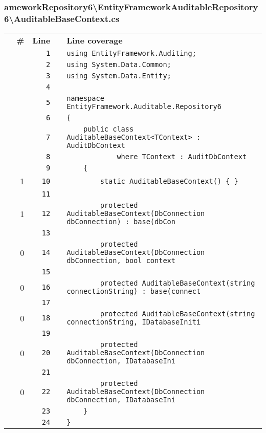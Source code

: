 \documentclass[a4paper,10pt]{article}
\begin{document}
\subsubsection{ameworkRepository6\textbackslash EntityFrameworkAuditableRepository6\textbackslash AuditableBaseContext.cs}
\begin{longtable}[l]{lrrll}
\textbf{} & \textbf{\#} & \textbf{Line} & \textbf{} & \textbf{Line coverage}\\
\cellcolor{gray} &  & \verb~1~ & & \verb~using EntityFramework.Auditing;~\\
\cellcolor{gray} &  & \verb~2~ & & \verb~using System.Data.Common;~\\
\cellcolor{gray} &  & \verb~3~ & & \verb~using System.Data.Entity;~\\
\cellcolor{gray} &  & \verb~4~ & & \verb~~\\
\cellcolor{gray} &  & \verb~5~ & & \verb~namespace EntityFramework.Auditable.Repository6~\\
\cellcolor{gray} &  & \verb~6~ & & \verb~{~\\
\cellcolor{gray} &  & \verb~7~ & & \verb~    public class AuditableBaseContext<TContext> : AuditDbContext~\\
\cellcolor{gray} &  & \verb~8~ & & \verb~            where TContext : AuditDbContext~\\
\cellcolor{gray} &  & \verb~9~ & & \verb~    {~\\
\cellcolor{green} & 1 & \verb~10~ & & \verb~        static AuditableBaseContext() { }~\\
\cellcolor{gray} &  & \verb~11~ & & \verb~~\\
\cellcolor{green} & 1 & \verb~12~ & & \verb~        protected AuditableBaseContext(DbConnection dbConnection) : base(dbCon~\\
\cellcolor{gray} &  & \verb~13~ & & \verb~~\\
\cellcolor{red} & 0 & \verb~14~ & & \verb~        protected AuditableBaseContext(DbConnection dbConnection, bool context~\\
\cellcolor{gray} &  & \verb~15~ & & \verb~~\\
\cellcolor{red} & 0 & \verb~16~ & & \verb~        protected AuditableBaseContext(string connectionString) : base(connect~\\
\cellcolor{gray} &  & \verb~17~ & & \verb~~\\
\cellcolor{red} & 0 & \verb~18~ & & \verb~        protected AuditableBaseContext(string connectionString, IDatabaseIniti~\\
\cellcolor{gray} &  & \verb~19~ & & \verb~~\\
\cellcolor{red} & 0 & \verb~20~ & & \verb~        protected AuditableBaseContext(DbConnection dbConnection, IDatabaseIni~\\
\cellcolor{gray} &  & \verb~21~ & & \verb~~\\
\cellcolor{red} & 0 & \verb~22~ & & \verb~        protected AuditableBaseContext(DbConnection dbConnection, IDatabaseIni~\\
\cellcolor{gray} &  & \verb~23~ & & \verb~    }~\\
\cellcolor{gray} &  & \verb~24~ & & \verb~}~\\
\end{longtable}
\newpage
\end{document}

